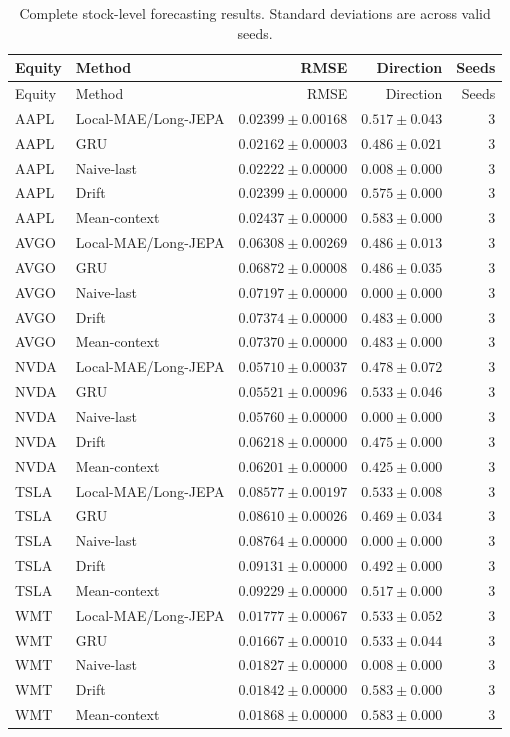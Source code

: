 \begin{longtable}{llrrr}
\caption{Complete stock-level forecasting results. Standard deviations are across valid seeds.}\label{tab:appendix_stock_metrics}\\
\toprule
Equity & Method & RMSE & Direction & Seeds \\
\midrule
\endfirsthead
\toprule
Equity & Method & RMSE & Direction & Seeds \\
\midrule
\endhead
AAPL & Local-MAE/Long-JEPA & $0.02399 \pm 0.00168$ & $0.517 \pm 0.043$ & 3 \\
AAPL & GRU & $0.02162 \pm 0.00003$ & $0.486 \pm 0.021$ & 3 \\
AAPL & Naive-last & $0.02222 \pm 0.00000$ & $0.008 \pm 0.000$ & 3 \\
AAPL & Drift & $0.02399 \pm 0.00000$ & $0.575 \pm 0.000$ & 3 \\
AAPL & Mean-context & $0.02437 \pm 0.00000$ & $0.583 \pm 0.000$ & 3 \\
AVGO & Local-MAE/Long-JEPA & $0.06308 \pm 0.00269$ & $0.486 \pm 0.013$ & 3 \\
AVGO & GRU & $0.06872 \pm 0.00008$ & $0.486 \pm 0.035$ & 3 \\
AVGO & Naive-last & $0.07197 \pm 0.00000$ & $0.000 \pm 0.000$ & 3 \\
AVGO & Drift & $0.07374 \pm 0.00000$ & $0.483 \pm 0.000$ & 3 \\
AVGO & Mean-context & $0.07370 \pm 0.00000$ & $0.483 \pm 0.000$ & 3 \\
NVDA & Local-MAE/Long-JEPA & $0.05710 \pm 0.00037$ & $0.478 \pm 0.072$ & 3 \\
NVDA & GRU & $0.05521 \pm 0.00096$ & $0.533 \pm 0.046$ & 3 \\
NVDA & Naive-last & $0.05760 \pm 0.00000$ & $0.000 \pm 0.000$ & 3 \\
NVDA & Drift & $0.06218 \pm 0.00000$ & $0.475 \pm 0.000$ & 3 \\
NVDA & Mean-context & $0.06201 \pm 0.00000$ & $0.425 \pm 0.000$ & 3 \\
TSLA & Local-MAE/Long-JEPA & $0.08577 \pm 0.00197$ & $0.533 \pm 0.008$ & 3 \\
TSLA & GRU & $0.08610 \pm 0.00026$ & $0.469 \pm 0.034$ & 3 \\
TSLA & Naive-last & $0.08764 \pm 0.00000$ & $0.000 \pm 0.000$ & 3 \\
TSLA & Drift & $0.09131 \pm 0.00000$ & $0.492 \pm 0.000$ & 3 \\
TSLA & Mean-context & $0.09229 \pm 0.00000$ & $0.517 \pm 0.000$ & 3 \\
WMT & Local-MAE/Long-JEPA & $0.01777 \pm 0.00067$ & $0.533 \pm 0.052$ & 3 \\
WMT & GRU & $0.01667 \pm 0.00010$ & $0.533 \pm 0.044$ & 3 \\
WMT & Naive-last & $0.01827 \pm 0.00000$ & $0.008 \pm 0.000$ & 3 \\
WMT & Drift & $0.01842 \pm 0.00000$ & $0.583 \pm 0.000$ & 3 \\
WMT & Mean-context & $0.01868 \pm 0.00000$ & $0.583 \pm 0.000$ & 3 \\
\bottomrule
\end{longtable}
